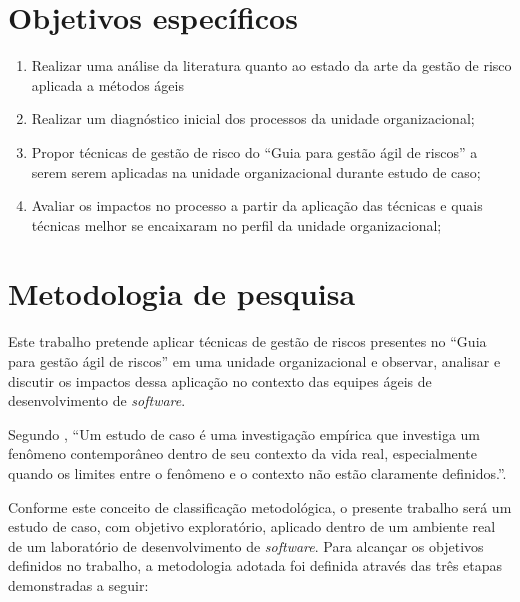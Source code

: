 \documentclass[
    12pt,       %
    openright,      %
    twoside,      %
    a4paper,      %
    english,      %
    french,       %
    spanish,      %
    brazil,       %
    ]{abntex2}
\begin{document}
\section{Objetivos específicos}
\begin{enumerate}
     \item Realizar uma análise da literatura quanto ao estado da arte da gestão de risco aplicada a métodos ágeis
    \item Realizar um diagnóstico inicial dos processos da unidade organizacional;
    \item Propor técnicas de gestão de risco do “Guia para gestão ágil de riscos” \cite{Vieira:2020} a serem serem aplicadas na unidade organizacional durante estudo de caso;
    \item Avaliar os impactos no processo a partir da aplicação das técnicas e quais técnicas melhor se encaixaram no perfil da unidade organizacional;
\end{enumerate}

\section{Metodologia de pesquisa}

Este trabalho pretende aplicar técnicas de gestão de riscos presentes no “Guia para gestão ágil de riscos”  \cite{Vieira:2020} em uma unidade organizacional e observar, analisar e discutir os impactos dessa aplicação no contexto das equipes ágeis de desenvolvimento de \textit{software}.

Segundo , “Um estudo de caso é uma investigação empírica que investiga um fenômeno contemporâneo dentro de seu contexto da vida real, especialmente quando os limites entre o fenômeno e o contexto não estão claramente
definidos.”. 

Conforme este conceito de classificação metodológica, o presente trabalho será um estudo de caso, com objetivo exploratório, aplicado dentro de um ambiente real de um laboratório de desenvolvimento de \textit{software}. Para alcançar os objetivos definidos no trabalho, a metodologia adotada foi definida através das três etapas demonstradas a seguir: 
\end{document}

